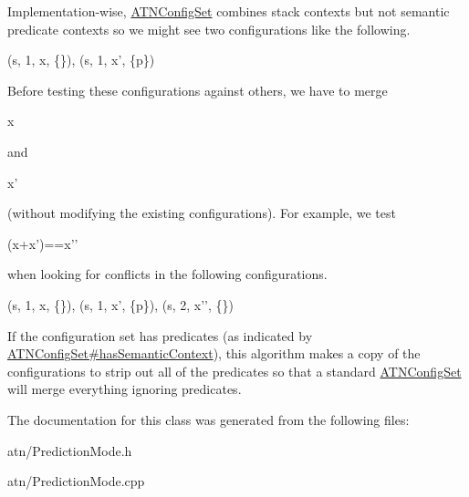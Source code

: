 Implementation-\/wise, \hyperlink{classantlr4_1_1atn_1_1ATNConfigSet}{A\+T\+N\+Config\+Set} combines stack contexts but not semantic predicate contexts so we might see two configurations like the following.


\begin{DoxyCode}
(s, 1, x, \{\}), (s, 1, x\textcolor{stringliteral}{', \{p\}) }
\end{DoxyCode}
 

Before testing these configurations against others, we have to merge 
\begin{DoxyCode}
x 
\end{DoxyCode}
 and
\begin{DoxyCode}
x\textcolor{stringliteral}{' }
\end{DoxyCode}
 (without modifying the existing configurations). For example, we test
\begin{DoxyCode}
(x+x\textcolor{stringliteral}{')==x'}\textcolor{stringliteral}{' }
\end{DoxyCode}
 when looking for conflicts in the following configurations.


\begin{DoxyCode}
(s, 1, x, \{\}), (s, 1, x\textcolor{stringliteral}{', \{p\}), (s, 2, x'}\textcolor{stringliteral}{', \{\}) }
\end{DoxyCode}
 

If the configuration set has predicates (as indicated by \hyperlink{}{A\+T\+N\+Config\+Set\#has\+Semantic\+Context}), this algorithm makes a copy of the configurations to strip out all of the predicates so that a standard \hyperlink{classantlr4_1_1atn_1_1ATNConfigSet}{A\+T\+N\+Config\+Set} will merge everything ignoring predicates.

The documentation for this class was generated from the following files\+:\begin{DoxyCompactItemize}
\item 
atn/Prediction\+Mode.\+h\item 
atn/Prediction\+Mode.\+cpp\end{DoxyCompactItemize}
